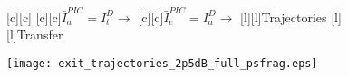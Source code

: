 \documentclass{article}
\begin{document}
\begin{figure}[htb]
  \begin{center}

        [c][c]{}
        [c][c]{$\bar{I}_a^{PIC}=I_t^D \rightarrow$}
        [c][c]{$\bar{I}_e^{PIC}=I_a^D \rightarrow$}
        [l][l]{Trajectories}
        [l][l]{Transfer}
        

    \texttt{[image: exit\_trajectories\_2p5dB\_full\_psfrag.eps]}
    \end{center}
\end{figure}
\end{document}
